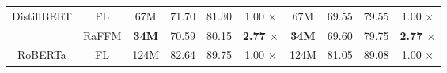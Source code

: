 \begin{table}
{\begin{tabular}{cccccccccc}
                                &                                  &                                   &                                        &                              &                                    &                                   &                                        &                              &                                    \\ \hline
\multirow{4}{*}{DistillBERT}    & \multirow{2}{*}{FL}              & \multirow{2}{*}{67M}              & \multirow{2}{*}{71.70}                 & \multirow{2}{*}{81.30}       & \multirow{2}{*}{1.00 $\times$}     & \multirow{2}{*}{67M}              & \multirow{2}{*}{69.55}                 & \multirow{2}{*}{79.55}       & \multirow{2}{*}{1.00 $\times$}     \\
                                &                                  &                                   &                                        &                              &                                    &                                   &                                        &                              &                                    \\
                                & \multirow{2}{*}{RaFFM}           & \multirow{2}{*}{\textbf{34M}}              & \multirow{2}{*}{70.59}                 & \multirow{2}{*}{80.15}       & \multirow{2}{*}{\textbf{2.77 $\times$}}     & \multirow{2}{*}{\textbf{34M}}              & \multirow{2}{*}{69.60}                 & \multirow{2}{*}{79.75}       & \multirow{2}{*}{\textbf{2.77 $\times$}}     \\
                                &                                  &                                   &                                        &                              &                                    &                                   &                                        &                              &                                    \\ \hline
\multirow{4}{*}{RoBERTa}        & \multirow{2}{*}{FL}              & \multirow{2}{*}{124M}             & \multirow{2}{*}{82.64}                 & \multirow{2}{*}{89.75}       & \multirow{2}{*}{1.00 $\times$}     & \multirow{2}{*}{124M}             & \multirow{2}{*}{81.05}                 & \multirow{2}{*}{89.08}       & \multirow{2}{*}{1.00 $\times$}     \\
                                &                                  &                                   &                                        &                              &                                    &                                   &                                        &                              &                                    \\

\end{tabular}}
\end{table}
